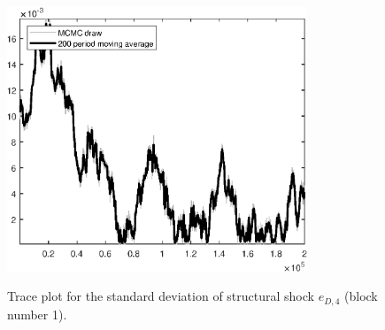 \begin{figure}[H]
\centering
  \includegraphics[width=0.8\textwidth]{BRS_sectoral_rest/graphs/TracePlot_SE_e_D_news_blck_1}\\
    \caption{Trace plot for the standard deviation of structural shock ${e_{D,4}}$ (block number 1).}
\end{figure}

